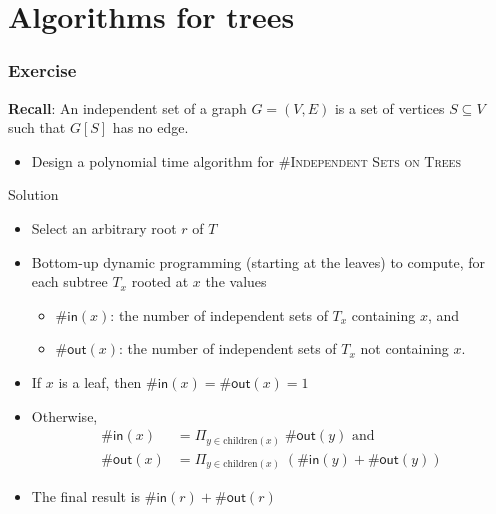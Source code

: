 


	

\section{Algorithms for trees}

\begin{frame}
 \frametitle{Exercise}
 
  \noindent
 	\textbf{Recall}: An \alert{independent set} of a graph $G=(V,E)$ is a set of vertices $S\subseteq V$ such that $G[S]$ has no edge.
 	
        
        \begin{itemize}
         \item Design a polynomial time algorithm for \#\textsc{Independent Sets on Trees}
        \end{itemize}

\end{frame}


\newcommand{\nbin}{\ensuremath{\mathsf{\#in}}}
\newcommand{\nbout}{\ensuremath{\mathsf{\#out}}}
\newcommand{\nboutD}{\ensuremath{\mathsf{\#outD}}}
\newcommand{\nboutND}{\ensuremath{\mathsf{\#outND}}}


\begin{frame}{Solution}
	\begin{itemize}
		\item Select an arbitrary root $r$ of $T$
		\item Bottom-up dynamic programming (starting at the leaves) to compute, for each subtree $T_x$ rooted at $x$ the values
		\begin{itemize}
			\item $\nbin(x)$: the number of independent sets of $T_x$ containing $x$, and
			\item $\nbout(x)$: the number of independent sets of $T_x$ not containing $x$.
		\end{itemize}
		\item If $x$ is a leaf, then $\nbin(x)=\nbout(x)=1$
		\item Otherwise,
		\begin{align*}
		 \nbin(x) &= \Pi_{y \in \text{children} (x)} \;\nbout(y) \text{ and}\\
		 \nbout(x) &= \Pi_{y \in \text{children} (x)} \;(\nbin(y)+\nbout(y))
		\end{align*}
		\item The final result is $\nbin(r)+\nbout(r)$
	\end{itemize}
\end{frame}



